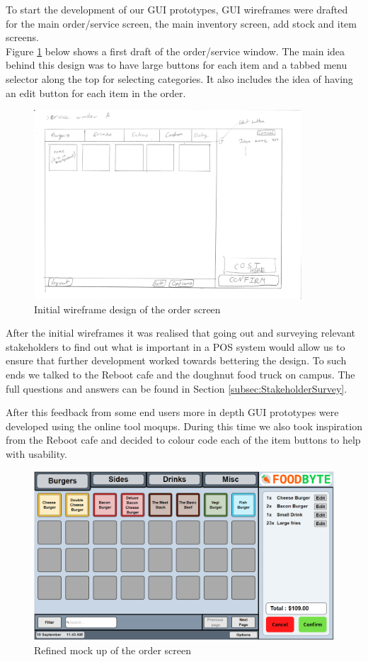 
To start the development of our GUI prototypes,  GUI wireframes were drafted for the main order/service screen, the main inventory screen, add stock and item screens. \\

Figure \ref{fig:Service_window_A} below shows a first draft of the order/service window. The main idea behind this design was to have large buttons for each item and a tabbed menu selector along the top for selecting categories. It also includes the idea of having an edit button for each item in the order.

\begin{figure}[ht]
	\centering
	\includegraphics[width=100mm,angle=-90]{images/Wireframe_drafts/Service_window_A.jpg}
	\caption{Initial wireframe design of the order screen}
	\label{fig:Service_window_A}
\end{figure}

After the initial wireframes it was realised that going out and surveying relevant stakeholders to find out what is important in a POS system would allow us to ensure that further development worked towards bettering the design. To such ends we talked to the Reboot cafe and the doughnut food truck on campus. The full questions and answers can be found in Section \ref{subsec:StakeholderSurvey}.

After this feedback from some end users more in depth GUI prototypes were developed using the online tool moqups. During this time we also took inspiration from the Reboot cafe and decided to colour code each of the item buttons to help with usability.
\pagebreak

\begin{figure}[ht]
	\centering
	\includegraphics[width=150mm]{images/GUI_prototypes/Order_screen.PNG}
	\caption{Refined mock up of the order screen}
	\label{fig:order_screen_moqueup}
\end{figure}

